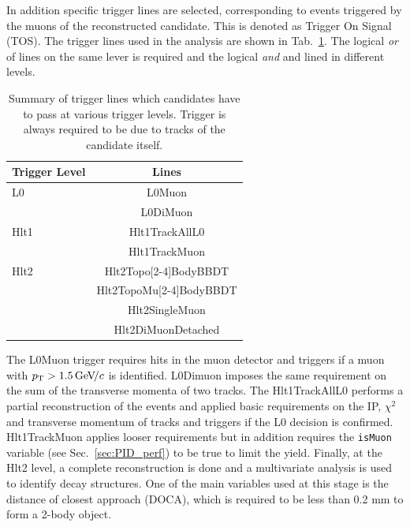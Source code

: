 In addition specific trigger lines are selected, corresponding to events triggered by the muons
of the reconstructed candidate. This is denoted as Trigger On Signal (TOS).
The trigger lines used in the analysis are shown in Tab.~\ref{tab:Lb_triggerLines}.
The logical {\em or } of lines on the same lever is required and the logical {\em and }
and lined in different levels.
%
\begin{table}
\centering
\caption{Summary of trigger lines which candidates have to pass at various trigger levels.
Trigger is always required to be due to tracks of the candidate itself.}
\begin{tabular}{lc} \hline
Trigger Level &  Lines   \\ \hline
L0            & L0Muon  \\
                & L0DiMuon \\ \hline
Hlt1          & Hlt1TrackAllL0 \\ 
                & Hlt1TrackMuon      \\ \hline
Hlt2          & Hlt2Topo[2-4]BodyBBDT  \\
              & Hlt2TopoMu[2-4]BodyBBDT\\
              & Hlt2SingleMuon     \\
              & Hlt2DiMuonDetached \\ \hline
\end{tabular}
\label{tab:Lb_triggerLines}
\end{table}
%
The L0Muon trigger requires hits in the muon detector and triggers if a muon with $\mbox{$p_{\rm T}$} > 1.5 {\mathrm{\,Ge\kern -0.1em V\!/}c}$ is identified.
L0Dimuon imposes the same requirement on the sum of the transverse momenta of two tracks.
The Hlt1TrackAllL0 performs a partial reconstruction of the events and applied basic requirements on the
IP, $\chi^2$ and transverse momentum of tracks and triggers if the L0 decision is confirmed. Hlt1TrackMuon applies looser requirements 
but in addition requires the \verb!isMuon! variable (see Sec.~\ref{sec:PID_perf}) to be true to limit the yield.
Finally, at the Hlt2 level, a complete reconstruction is done and a multivariate analysis is used to identify decay structures. One of the main variables used at this stage is the distance of closest approach (DOCA), which is 
required to be less than 0.2 mm to form a 2-body object.
%



